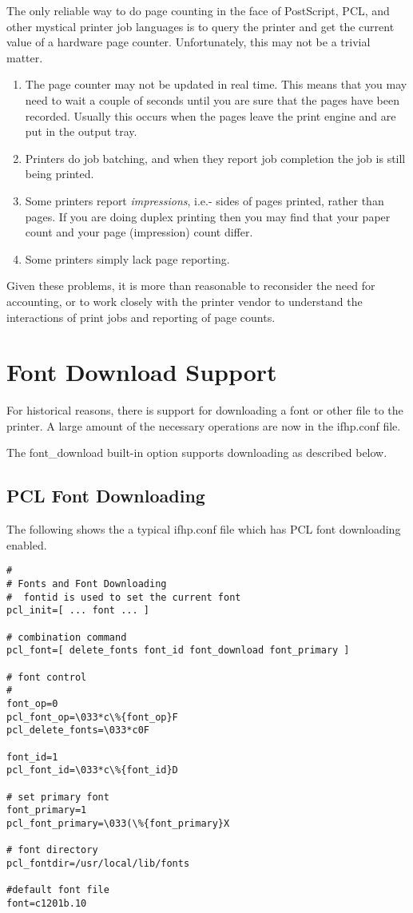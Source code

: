 \documentclass[a4paper]{article}
\begin{document}
The only reliable way to do page counting in the face of
PostScript,
PCL,
and other mystical printer job languages is to query the printer
and get the current value of a hardware page counter.
Unfortunately,
this may not be a trivial matter.
\begin{enumerate}
\item The page counter may not be updated in real time.
This means that you may need to wait a couple of seconds until you are
sure that the pages have been recorded.
Usually this occurs when the pages leave the print engine
and are put in the output tray.
\item Printers do job batching,
and when they report job completion the job is still being printed.
\item Some printers report
{\itshape impressions\/},
i.e.- sides of pages printed,
rather than pages.
If you are doing duplex printing then you may find that your
paper count and your page (impression) count differ.
\item Some printers simply lack page reporting.
\end{enumerate}


Given these problems,
it is more than reasonable to reconsider the need for accounting,
or to work closely with the printer vendor to understand the
interactions of print jobs and reporting of page counts.


\section{Font Download Support}

For historical reasons,
there is support for downloading a font or other file to the
printer.
A large amount of the necessary operations are now in the
{\ttfamily ifhp.conf}
file.

The
{\ttfamily font\_download}
built-in option supports downloading as described below.


\subsection{PCL Font Downloading}

The following shows the a typical
{\ttfamily ifhp.conf}
file which has PCL font downloading enabled.
\begin{tscreen}
\begin{verbatim}
#
# Fonts and Font Downloading
#  fontid is used to set the current font
pcl_init=[ ... font ... ]

# combination command
pcl_font=[ delete_fonts font_id font_download font_primary ]

# font control
#
font_op=0
pcl_font_op=\033*c\%{font_op}F
pcl_delete_fonts=\033*c0F

font_id=1
pcl_font_id=\033*c\%{font_id}D

# set primary font
font_primary=1
pcl_font_primary=\033(\%{font_primary}X

# font directory
pcl_fontdir=/usr/local/lib/fonts

#default font file
font=c1201b.10
\end{verbatim}
\end{tscreen}
\end{document}
